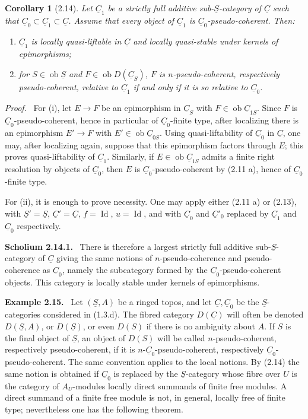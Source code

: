 \documentclass[13pt]{extarticle}
\newcommand{\uS}{\underline S}
\newcommand{\uC}{\underline C}
\newcommand{\ob}{\operatorname{ob}}
\newenvironment{statement}[1]{\par\medskip\noindent\textbf{#1.}\ }{\par\medskip}
\newenvironment{prooftext}[1][Proof]{\par\noindent\emph{#1.}\ }{\par\medskip}
\newtheorem*{corollary*}{Corollary}
\begin{document}
\begin{corollary*}[2.14]
Let $\uC_1$ be a strictly full additive sub-$\uS$-category of $\uC$ such that $\uC_0\subset\uC_1\subset\uC$. Assume that every object of $\uC_1$ is $\uC_0$-pseudo-coherent. Then:
\begin{enumerate}[label=(\roman*)]
\item $\uC_1$ is locally quasi-liftable in $\uC$ and locally quasi-stable under kernels of epimorphisms;
\item for $S\in\ob\uS$ and $F\in\ob D(\uC_S)$, $F$ is $n$-pseudo-coherent, respectively pseudo-coherent, relative to $\uC_1$ if and only if it is so relative to $\uC_0$.
\end{enumerate}
\end{corollary*}

\begin{prooftext}
For (i), let $E\to F$ be an epimorphism in $\uC_S$ with $F\in\ob\uC_{1S}$. Since $F$ is $\uC_0$-pseudo-coherent, hence in particular of $\uC_0$-finite type, after localizing there is an epimorphism $E'\to F$ with $E'\in\ob\uC_{0S}$. Using quasi-liftability of $\uC_0$ in $\uC$, one may, after localizing again, suppose that this epimorphism factors through $E$; this proves quasi-liftability of $\uC_1$. Similarly, if $E\in\ob\uC_{1S}$ admits a finite right resolution by objects of $\uC_0$, then $E$ is $\uC_0$-pseudo-coherent by (2.11 a), hence of $\uC_0$-finite type.

For (ii), it is enough to prove necessity. One may apply either (2.11 a) or (2.13), with $\uS'=\uS$, $\uC'=\uC$, $f=\operatorname{Id}$, $u=\operatorname{Id}$, and with $\uC_0$ and $\uC'_0$ replaced by $\uC_1$ and $\uC_0$ respectively.
\end{prooftext}

\begin{statement}{Scholium 2.14.1}
There is therefore a largest strictly full additive sub-$\uS$-category of $\uC$ giving the same notions of $n$-pseudo-coherence and pseudo-coherence as $\uC_0$, namely the subcategory formed by the $\uC_0$-pseudo-coherent objects. This category is locally stable under kernels of epimorphisms.
\end{statement}

\begin{statement}{Example 2.15}
Let $(\uS,A)$ be a ringed topos, and let $\uC,\uC_0$ be the $\uS$-categories considered in (1.3.d). The fibred category $D(\uC)$ will often be denoted $D(\uS,A)$, or $D(\uS)$, or even $D(S)$ if there is no ambiguity about $A$. If $S$ is the final object of $\uS$, an object of $D(S)$ will be called $n$-pseudo-coherent, respectively pseudo-coherent, if it is $n$-$\uC_0$-pseudo-coherent, respectively $\uC_0$-pseudo-coherent. The same convention applies to the local notions. By (2.14) the same notion is obtained if $\uC_0$ is replaced by the $\uS$-category whose fibre over $U$ is the category of $A_U$-modules locally direct summands of finite free modules. A direct summand of a finite free module is not, in general, locally free of finite type; nevertheless one has the following theorem.
\end{statement}
\end{document}
